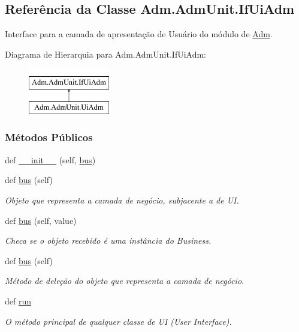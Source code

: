 \hypertarget{classAdm_1_1AdmUnit_1_1IfUiAdm}{}\subsection{Referência da Classe Adm.\+Adm\+Unit.\+If\+Ui\+Adm}
\label{classAdm_1_1AdmUnit_1_1IfUiAdm}


Interface para a camada de apresentação de Usuário do módulo de \hyperlink{namespaceAdm}{Adm}.  


Diagrama de Hierarquia para Adm.\+Adm\+Unit.\+If\+Ui\+Adm\+:\begin{figure}[H]
\begin{center}
\leavevmode
\includegraphics[height=2.000000cm]{d7/d07/classAdm_1_1AdmUnit_1_1IfUiAdm}
\end{center}
\end{figure}
\subsubsection*{Métodos Públicos}
\begin{DoxyCompactItemize}
\item 
def \hyperlink{classAdm_1_1AdmUnit_1_1IfUiAdm_a971d8248262cb673fcbb104fa416f5ba}{\+\_\+\+\_\+init\+\_\+\+\_\+} (self, \hyperlink{classAdm_1_1AdmUnit_1_1IfUiAdm_a604bb1c41014e85eee44db64a79a7fcc}{bus})
\item 
def \hyperlink{classAdm_1_1AdmUnit_1_1IfUiAdm_a6846282d9a13a62cfe54639b6ee121f8}{bus} (self)
\begin{DoxyCompactList}\small\item\em Objeto que representa a camada de negócio, subjacente a de U\+I. \end{DoxyCompactList}\item 
def \hyperlink{classAdm_1_1AdmUnit_1_1IfUiAdm_a7fd2fe0a69d29fe49668381ae5cb4e08}{bus} (self, value)
\begin{DoxyCompactList}\small\item\em Checa se o objeto recebido é uma instância do Business. \end{DoxyCompactList}\item 
def \hyperlink{classAdm_1_1AdmUnit_1_1IfUiAdm_a6846282d9a13a62cfe54639b6ee121f8}{bus} (self)
\begin{DoxyCompactList}\small\item\em Método de deleção do objeto que representa a camada de negócio. \end{DoxyCompactList}\item 
def \hyperlink{classAdm_1_1AdmUnit_1_1IfUiAdm_ad2879ed80544aa2a153c7eeed3a09a52}{run}
\begin{DoxyCompactList}\small\item\em O método principal de qualquer classe de U\+I (User Interface). \end{DoxyCompactList}\end{DoxyCompactItemize}
